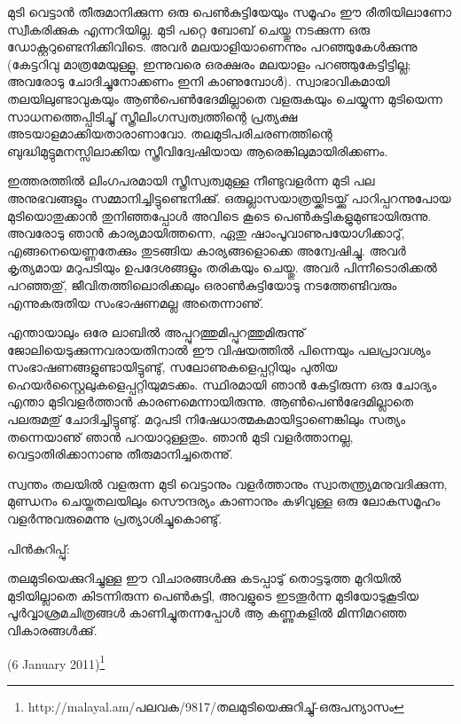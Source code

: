 മുടി വെട്ടാന്‍ തീരുമാനിക്കുന്ന ഒരു പെണ്‍കുട്ടിയേയും സമൂഹം ഈ രീതിയിലാണോ സ്വീകരിക്കുക എന്നറിയില്ല. മുടി പറ്റെ 
ബോബ് ചെയ്തു നടക്കുന്ന ഒരു ഡോക്റ്ററുണ്ടെനിക്കിവിടെ. അവര്‍ മലയാളിയാണെന്നും പറഞ്ഞുകേള്‍ക്കുന്നു (കേട്ടറിവു മാത്രമേയുള്ളൂ, 
ഇന്നുവരെ ഒരക്ഷരം മലയാളം പറഞ്ഞുകേട്ടിട്ടില്ല; അവരോടു ചോദിച്ചുനോക്കണം ഇനി കാണുമ്പോള്‍). സ്വാഭാവികമായി 
തലയിലുണ്ടാവുകയും ആണ്‍പെണ്‍ഭേദമില്ലാതെ വളരുകയും ചെയ്യുന്ന മുടിയെന്ന സാധനത്തെപ്പിടിച്ചു് 
സ്ത്രീലിംഗസ്വത്വത്തിന്റെ പ്രത്യക്ഷ അടയാളമാക്കിയതാരാണാവോ. തലമുടിപരിചരണത്തിന്റെ ബുദ്ധിമുട്ടുമനസ്സിലാക്കിയ സ്ത്രീവിദ്വേഷിയായ ആരെങ്കിലുമായിരിക്കണം.

ഇത്തരത്തില്‍ ലിംഗപരമായി സ്ത്രീസ്വത്വമുള്ള നീണ്ടുവളര്‍ന്ന മുടി പല അനുഭവങ്ങളും സമ്മാനിച്ചിട്ടുണ്ടെനിക്കു്. 
ഒരുല്ലാസയാത്രയ്ക്കിടയ്ക്കു് പാറിപ്പറന്നുപോയ മുടിയൊതുക്കാന്‍ തുനിഞ്ഞപ്പോള്‍ അവിടെ കൂടെ 
പെണ്‍കുട്ടികളുമുണ്ടായിരുന്നു. അവരോടു ഞാന്‍ കാര്യമായിത്തന്നെ, ഏതു ഷാംപൂവാണുപയോഗിക്കാറു്, എങ്ങനെയെണ്ണതേക്കും 
തുടങ്ങിയ കാര്യങ്ങളൊക്കെ അന്വേഷിച്ചു. അവര്‍ കൃത്യമായ മറുപടിയും ഉപദേശങ്ങളും തരികയും ചെയ്തു. അവര്‍ പിന്നീടൊരിക്കല്‍ പറഞ്ഞതു്, 
ജീവിതത്തിലൊരിക്കലും ഒരാണ്‍കുട്ടിയോടു നടത്തേണ്ടിവരും എന്നുകരുതിയ സംഭാഷണമല്ല അതെന്നാണു്.

എന്തായാലും ഒരേ ലാബില്‍ അപ്പുറത്തുമിപ്പുറത്തുമിരുന്നു് ജോലിയെടുക്കുന്നവരായതിനാല്‍ ഈ വിഷയത്തില്‍ പിന്നെയും 
പലപ്രാവശ്യം സംഭാഷണങ്ങളുണ്ടായിട്ടുണ്ടു്, സലോണുകളെപ്പറ്റിയും പുതിയ ഹെയര്‍സ്റ്റൈലുകളെപ്പറ്റിയുമടക്കം. 
സ്ഥിരമായി ഞാന്‍ കേട്ടിരുന്ന ഒരു ചോദ്യം എന്താ മുടിവളര്‍ത്താന്‍ കാരണമെന്നായിരുന്നു. ആണ്‍പെണ്‍ഭേദമില്ലാതെ 
പലരുമതു് ചോദിച്ചിട്ടുണ്ടു്. മറുപടി നിഷേധാത്മകമായിട്ടാണെങ്കിലും സത്യം തന്നെയാണു് ഞാന്‍ പറയാറുള്ളതും. ഞാന്‍ മുടി 
വളര്‍ത്താനല്ല, വെട്ടാതിരിക്കാനാണു തീരുമാനിച്ചതെന്നു്.

സ്വന്തം തലയില്‍ വളരുന്ന മുടി വെട്ടാനും വളര്‍ത്താനും സ്വാതന്ത്ര്യമനുവദിക്കുന്ന, മുണ്ഡനം ചെയ്തതലയിലും 
സൌന്ദര്യം കാണാനും കഴിവുള്ള ഒരു ലോകസമൂഹം വളര്‍ന്നുവരുമെന്നു പ്രത്യാശിച്ചുകൊണ്ടു്.

പിന്‍കുറിപ്പു്:

തലമുടിയെക്കുറിച്ചുള്ള ഈ വിചാരങ്ങള്‍ക്കു കടപ്പാടു് തൊട്ടടുത്ത മുറിയില്‍ മുടിയില്ലാതെ കിടന്നിരുന്ന പെണ്‍കുട്ടി, അവളുടെ ഇടതൂര്‍ന്ന മുടിയോടുകൂടിയ പൂര്‍വ്വാശ്രമചിത്രങ്ങള്‍ കാണിച്ചുതന്നപ്പോള്‍ ആ കണ്ണുകളില്‍ മിന്നിമറഞ്ഞ വികാരങ്ങള്‍ക്കു്.

(6 January 2011)\footnote{http://malayal.am/പലവക/9817/തലമുടിയെക്കുറിച്ചു്-ഒരുപന്യാസം}

\newpage
